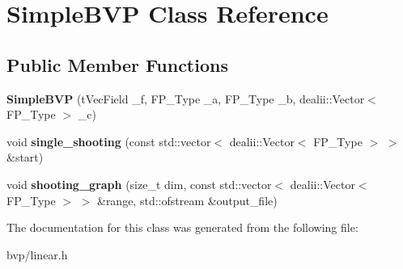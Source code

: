 \hypertarget{classSimpleBVP}{}\section{Simple\+B\+VP Class Reference}
\label{classSimpleBVP}
\subsection*{Public Member Functions}
\begin{DoxyCompactItemize}
\item 
\mbox{\label{classSimpleBVP_a6b5cb3f7eef708ea80705b49893db1f7}} 
{\bfseries Simple\+B\+VP} (t\+Vec\+Field \+\_\+f, F\+P\+\_\+\+Type \+\_\+a, F\+P\+\_\+\+Type \+\_\+b, dealii\+::\+Vector$<$ F\+P\+\_\+\+Type $>$ \+\_\+c)
\item 
\mbox{\label{classSimpleBVP_a3085881da75e24c9ef2c99edb7f1c64e}} 
void {\bfseries single\+\_\+shooting} (const std\+::vector$<$ dealii\+::\+Vector$<$ F\+P\+\_\+\+Type $>$ $>$ \&start)
\item 
\mbox{\label{classSimpleBVP_ae2f66c0ceb82143efd2aa6112850c322}} 
void {\bfseries shooting\+\_\+graph} (size\+\_\+t dim, const std\+::vector$<$ dealii\+::\+Vector$<$ F\+P\+\_\+\+Type $>$ $>$ \&range, std\+::ofstream \&output\+\_\+file)
\end{DoxyCompactItemize}


The documentation for this class was generated from the following file\+:\begin{DoxyCompactItemize}
\item 
bvp/linear.\+h\end{DoxyCompactItemize}
